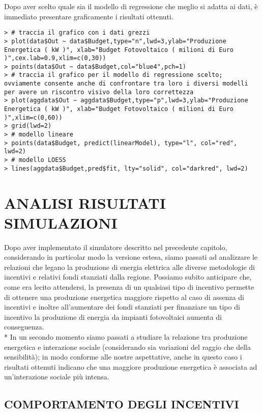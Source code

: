 \documentclass[12pt,a4paper,openright,twoside]{report}
\begin{document}
Dopo aver scelto quale sia il modello di regressione che meglio si adatta ai dati, è immediato presentare graficamente i risultati ottenuti.

\begin{lstlisting}
> # traccia il grafico con i dati grezzi
> plot(data$Out ~ data$Budget,type="n",lwd=3,ylab="Produzione Energetica ( kW )", xlab="Budget Fotovoltaico ( milioni di Euro )",cex.lab=0.9,xlim=c(0,30))
> points(data$Out ~ data$Budget,col="blue4",pch=1)
> # traccia il grafico per il modello di regressione scelto; ovviamente consente anche di confrontare tra loro i diversi modelli per avere un riscontro visivo della loro correttezza
> plot(aggdata$Out ~ aggdata$Budget,type="p",lwd=3,ylab="Produzione Energetica ( kW )", xlab="Budget Fotovoltaico ( milioni di Euro )",xlim=c(0,60)) 
> grid(lwd=2)
> # modello lineare
> points(data$Budget, predict(linearModel), type="l", col="red", lwd=2)
> # modello LOESS
> lines(aggdata$Budget,pred$fit, lty="solid", col="darkred", lwd=2)
\end{lstlisting}

\section[ANALISI RISULTATI]{ANALISI RISULTATI SIMULAZIONI}

Dopo aver implementato il simulatore descritto nel precedente capitolo, considerando in particolar modo la versione estesa, siamo passati ad analizzare le relazioni che legano la produzione di energia elettrica alle diverse metodologie di incentivi e relativi fondi stanziati dalla regione. Possiamo subito anticipare che, come era lecito attendersi, la presenza di un qualsiasi tipo di incentivo permette di ottenere una produzione energetica maggiore rispetto al caso di assenza di incentivi e inoltre all'aumentare dei fondi stanziati per finanziare un tipo di incentivo la produzione di energia da impianti fotovoltaici aumenta di conseguenza.\\*
In un secondo momento siamo passati a studiare la relazione tra produzione energetica e interazione sociale (considerando sia variazioni del raggio che della sensibilità); in modo conforme alle nostre aspettative, anche in questo caso i risultati ottenuti indicano che una maggiore produzione energetica è associata ad un'interazione sociale più intensa.


\subsection{COMPORTAMENTO DEGLI INCENTIVI}
\end{document}
